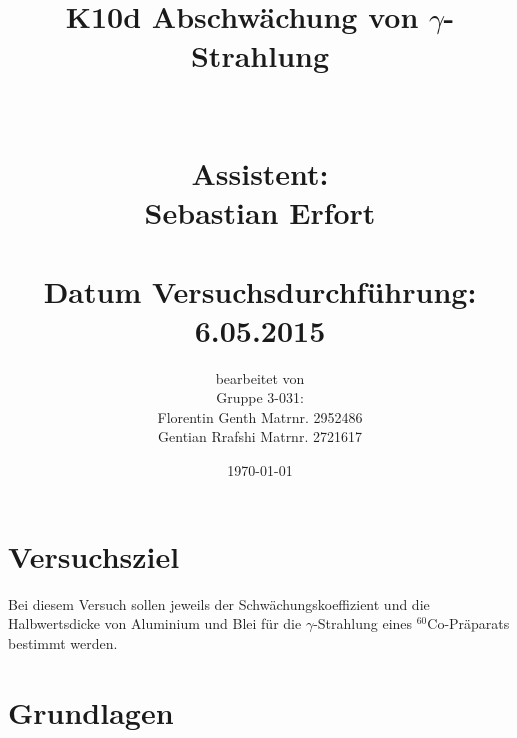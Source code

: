 \documentclass[fontsize=12pt]{scrartcl}
\begin{document}
\begin{minipage}{\textwidth}
\begin{center}\large
\title{K10d Abschwächung  von $\gamma$-Strahlung \\
		~\\
		~\\
		Assistent: \\
		 Sebastian Erfort \\
		 ~\\
		Datum Versuchsdurchführung: \\
		6.05.2015}

\author{bearbeitet von\\
		Gruppe 3-031: \\
		Florentin Genth Matrnr. 2952486 \\
		Gentian Rrafshi Matrnr. 2721617 }
\date{\today}

\maketitle

\end{center}
\end{minipage}

\newpage

\tableofcontents

\newpage
\noindent

\section{ Versuchsziel}

Bei diesem Versuch sollen jeweils der Schwächungskoeffizient und die Halbwertsdicke von Aluminium und Blei für die $\gamma$-Strahlung eines $^{60}$Co-Präparats bestimmt werden.

\section{ Grundlagen}
\end{document}
